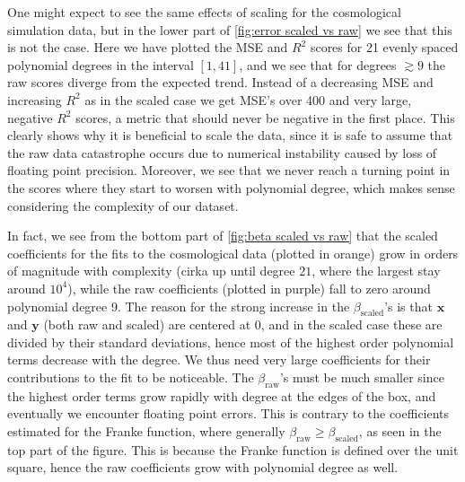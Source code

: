 \documentclass[aps,pra,english,notitlepage,reprint,nofootinbib]{revtex4-1}  %
\begin{document}
One might expect to see the same effects of scaling for the cosmological simulation data, but in the lower part of \cref{fig:error scaled vs raw} we see that this is not the case. Here we have plotted the MSE and $R^2$ scores for 21 evenly spaced polynomial degrees in the interval $[1,41]$, and we see that for degrees $\gtrsim9$ the raw scores diverge from the expected trend. Instead of a decreasing MSE and increasing $R^2$ as in the scaled case we get MSE's over 400 and very large, negative $R^2$ scores, a metric that should never be negative in the first place. This clearly shows why it is beneficial to scale the data, since it is safe to assume that the raw data catastrophe occurs due to numerical instability caused by loss of floating point precision. Moreover, we see that we never reach a turning point in the scores where they start to worsen with polynomial degree, which makes sense considering the complexity of our dataset.

In fact, we see from the bottom part of \cref{fig:beta scaled vs raw} that the scaled coefficients for the fits to the cosmological data (plotted in orange) grow in orders of magnitude with complexity (cirka up until degree $21$, where the largest stay around $10^4$), while the raw coefficients (plotted in purple) fall to zero around polynomial degree 9. The reason for the strong increase in the $\beta_\text{scaled}$'s is that $\mathbf{x}$ and $\mathbf{y}$ (both raw and scaled) are centered at 0, and in the scaled case these are divided by their standard deviations, hence most of the highest order polynomial terms decrease with the degree. We thus need very large coefficients for their contributions to the fit to be noticeable. The $\beta_\text{raw}$'s must be much smaller since the highest order terms grow rapidly with degree at the edges of the box, and eventually we encounter floating point errors. This is contrary to the coefficients estimated for the Franke function, where generally $\beta_\text{raw}\geq\beta_\text{scaled}$, as seen in the top part of the figure. This is because the Franke function is defined over the unit square, hence the raw coefficients grow with polynomial degree as well.
\end{document}

